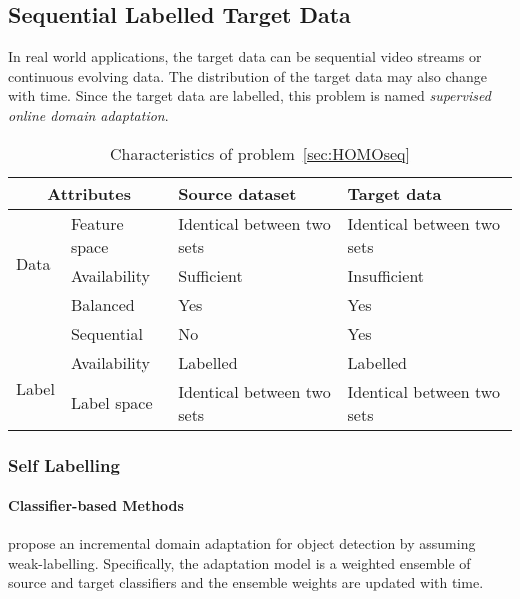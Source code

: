 \documentclass[prodmode]{acmsmall}  %
\begin{document}
\subsection{Sequential Labelled Target Data}
\label{sec:HOMOlseq}
In real world applications, the target data can be sequential video streams or continuous evolving data. The distribution of the target data may also change with time. Since the target data are labelled, this problem is named \textit{supervised online domain adaptation}.
\begin{table}[htbp!]
\caption{Characteristics of problem~\ref{sec:HOMOseq}}
\label{tab:HOMOlseq}
\begin{center}
\begin{small}
\begin{tabular}{|p{1cm}<{\centering}|m{2.5cm}<{\centering}|m{4.3cm}<{\centering}|m{4.3cm}<{\centering}|}
\hline
\multicolumn{2}{|c|}{Attributes} & Source dataset & Target data \\
\hline \hline
\multirow{3}{*}{Data} & Feature space & Identical between two sets & Identical between two sets \\ 
\cline{2-4}{} & Availability & Sufficient & {\color{red}Insufficient}  \\
\cline{2-4}{} & Balanced & Yes & Yes \\
\cline{2-4}{} & Sequential & No & {\color{red}Yes} \\
\hline \hline
\multirow{2}{*}{Label} & Availability & Labelled & Labelled \\
\cline{2-4}{}  & Label space & Identical between two sets & Identical between two sets \\ 
\hline
\end{tabular}
\end{small}
\end{center}
\end{table}
\subsubsection{Self Labelling}
\paragraph{Classifier-based Methods}
 propose an incremental domain adaptation for object detection by assuming weak-labelling. Specifically, the adaptation model is a weighted ensemble of source and target classifiers and the ensemble weights are updated with time.
\end{document}
